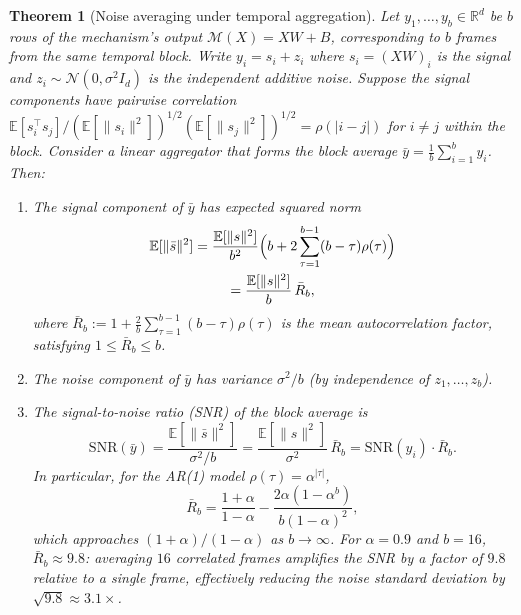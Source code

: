 \documentclass[letterpaper]{article} %
\newtheorem{theorem}{Theorem}
\begin{document}
\begin{theorem}[Noise averaging under temporal aggregation]
\label{thm:noise_averaging}
Let $y_1, \ldots, y_b \in \mathbb{R}^d$ be $b$ rows of the
mechanism's output $\mathcal{M}(X) = XW + B$, corresponding to $b$
frames from the same temporal block.  Write $y_i = s_i + z_i$ where
$s_i = (XW)_i$ is the signal and $z_i \sim \mathcal{N}(0, \sigma^2 I_d)$
is the independent additive noise.  Suppose the signal components have
pairwise correlation
$\mathbb{E}[s_i^\top s_j] / (\mathbb{E}[\|s_i\|^2])^{1/2}
(\mathbb{E}[\|s_j\|^2])^{1/2} = \rho(|i-j|)$ for $i \ne j$
within the block.  Consider a linear aggregator that forms the
block average $\bar{y} = \frac{1}{b}\sum_{i=1}^b y_i$.  Then:

\begin{enumerate}[label=(\roman*)]
\item The signal component of $\bar{y}$ has expected squared norm
\begin{multline}
\label{eq:signal_avg}
\mathbb{E}[\|\bar{s}\|^2]
= \frac{\mathbb{E}[\|s\|^2]}{b^2}
  \Bigl(b + 2\sum_{\tau=1}^{b-1}(b-\tau)\rho(\tau)\Bigr)
\\
= \frac{\mathbb{E}[\|s\|^2]}{b}\,\bar{R}_b,
\end{multline}
where $\bar{R}_b := 1 + \frac{2}{b}\sum_{\tau=1}^{b-1}(b-\tau)\rho(\tau)$
is the mean autocorrelation factor, satisfying $1 \le \bar{R}_b \le b$.

\item The noise component of $\bar{y}$ has variance $\sigma^2/b$
(by independence of $z_1, \ldots, z_b$).

\item The signal-to-noise ratio (SNR) of the block average is
\begin{equation}
\label{eq:snr_ratio}
\mathrm{SNR}(\bar{y})
= \frac{\mathbb{E}[\|\bar{s}\|^2]}{\sigma^2 / b}
= \frac{\mathbb{E}[\|s\|^2]}{\sigma^2}\,\bar{R}_b
= \mathrm{SNR}(y_i) \cdot \bar{R}_b.
\end{equation}
In particular, for the AR(1) model $\rho(\tau) = \alpha^{|\tau|}$,
\begin{equation}
\label{eq:snr_ar1}
\bar{R}_b
= \frac{1 + \alpha}{1 - \alpha}
  - \frac{2\alpha(1-\alpha^{b})}{b(1-\alpha)^2},
\end{equation}
which approaches $(1+\alpha)/(1-\alpha)$ as $b \to \infty$.
For $\alpha = 0.9$ and $b = 16$, $\bar{R}_b \approx 9.8$:
averaging $16$ correlated frames amplifies the SNR by a factor
of $9.8$ relative to a single frame, effectively reducing the
noise standard deviation by $\sqrt{9.8} \approx 3.1\times$.
\end{enumerate}
\end{theorem}
\end{document}
